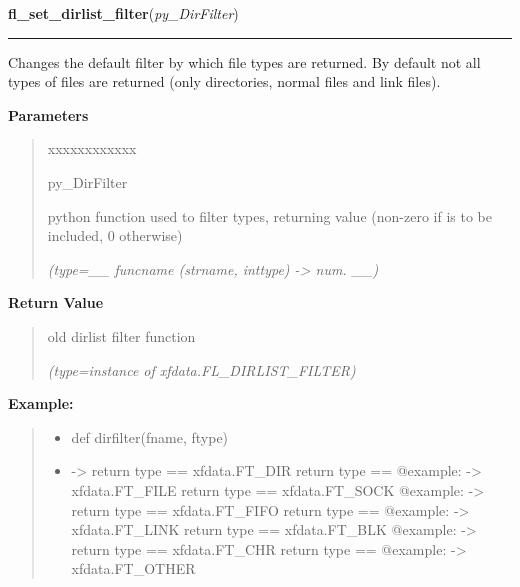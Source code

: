 \hspace{.8\funcindent}\begin{boxedminipage}{\funcwidth}

    \raggedright \textbf{fl\_set\_dirlist\_filter}(\textit{py\_DirFilter})

    \vspace{-1.5ex}

    \rule{\textwidth}{0.5\fboxrule}
\setlength{\parskip}{2ex}
    Changes the default filter by which file types are returned. By default
    not all types of files are returned (only directories, normal files and
    link files).

\setlength{\parskip}{1ex}
      \textbf{Parameters}
      \vspace{-1ex}

      \begin{quote}
        \begin{Ventry}{xxxxxxxxxxxx}

          \item[py\_DirFilter]

          python function used to filter types, returning value (non-zero 
          if is to be included, 0 otherwise)

            {\it (type=\_\_ funcname (strname, inttype) -{\textgreater} num. \_\_)}

        \end{Ventry}

      \end{quote}

      \textbf{Return Value}
    \vspace{-1ex}

      \begin{quote}
      old dirlist filter function

      {\it (type=instance of xfdata.FL\_DIRLIST\_FILTER)}

      \end{quote}

\textbf{Example:}
\begin{quote}
  \begin{itemize}

  \item
    \setlength{\parskip}{0.6ex}
def dirfilter(fname, ftype)



  \item {\textbar}-{\textgreater}{\textbar} return type == xfdata.FT\_DIR 
{\textbar}{\textbar} return type ==     @example: 
{\textbar}-{\textgreater}{\textbar} xfdata.FT\_FILE {\textbar}{\textbar} 
return type == xfdata.FT\_SOCK {\textbar}{\textbar}     @example: 
{\textbar}-{\textgreater}{\textbar} return type == xfdata.FT\_FIFO 
{\textbar}{\textbar} return type ==     @example: 
{\textbar}-{\textgreater}{\textbar} xfdata.FT\_LINK {\textbar}{\textbar} 
return type == xfdata.FT\_BLK {\textbar}{\textbar}     @example: 
{\textbar}-{\textgreater}{\textbar} return type == xfdata.FT\_CHR 
{\textbar}{\textbar} return type ==     @example: 
{\textbar}-{\textgreater}{\textbar} xfdata.FT\_OTHER




\end{itemize}
\end{quote}
\end{boxedminipage}
